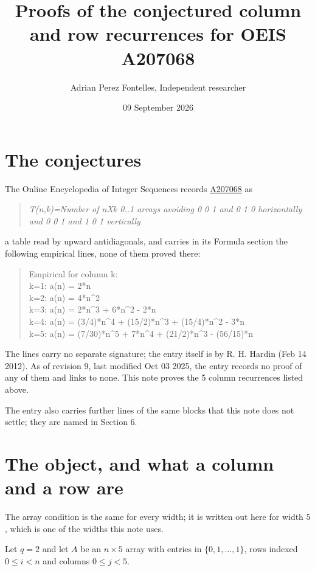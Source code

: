 \documentclass[11pt]{article}
\title{Proofs of the conjectured column and row recurrences for OEIS A207068}
\author{Adrian Perez Fontelles, Independent researcher}
\date{09 September 2026}
\theoremstyle{definition}
\begin{document}
\maketitle
\section{The conjectures}

The Online Encyclopedia of Integer Sequences records \href{https://oeis.org/A207068}{A207068} as

\begin{quote}\itshape T(n,k)=Number of nXk 0..1 arrays avoiding 0 0 1 and 0 1 0 horizontally and 0 0 1 and 1 0 1 vertically\end{quote}

a table read by upward antidiagonals, and carries in its Formula section the following empirical lines, none of them proved there:

\begin{quote}\ttfamily Empirical for column k:\\
k=1: a(n) = 2*n\\k=2: a(n) = 4*n\textasciicircum{}2\\k=3: a(n) = 2*n\textasciicircum{}3 + 6*n\textasciicircum{}2 - 2*n\\k=4: a(n) = (3/4)*n\textasciicircum{}4 + (15/2)*n\textasciicircum{}3 + (15/4)*n\textasciicircum{}2 - 3*n\\k=5: a(n) = (7/30)*n\textasciicircum{}5 + 7*n\textasciicircum{}4 + (21/2)*n\textasciicircum{}3 - (56/15)*n\end{quote}

The lines carry no separate signature; the entry itself is by R. H. Hardin (Feb 14 2012). As of revision 9, last modified Oct 03 2025, the entry records no proof of any of them and links to none. This note proves the 5 column recurrences listed above.

The entry also carries further lines of the same blocks that this note does not settle; they are named in Section 6.

\section{The object, and what a column and a row are}

The array condition is the same for every width; it is written out here for width $5$, which is one of the widths this note uses.

Let $q = 2$ and let $A$ be an $n \times 5$ array with entries in $\{0,1,\dots,1\}$, rows indexed $0 \le i < n$ and columns $0 \le j < 5$.
\end{document}
